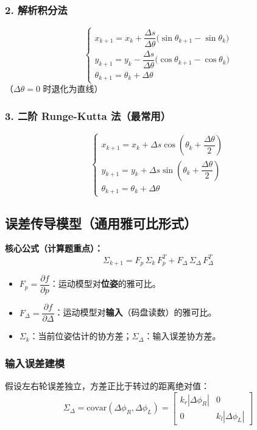 \documentclass[11pt,a4paper]{article}
\begin{document}
\subsubsection*{2. 解析积分法}
\[
\begin{cases}
x_{k+1}=x_k+\dfrac{\Delta s}{\Delta\theta}\bigl(\sin\theta_{k+1}-\sin\theta_k\bigr)\\[0.4em]
y_{k+1}=y_k-\dfrac{\Delta s}{\Delta\theta}\bigl(\cos\theta_{k+1}-\cos\theta_k\bigr)\\[0.4em]
\theta_{k+1}=\theta_k+\Delta\theta
\end{cases}
\]
（$\Delta\theta=0$ 时退化为直线）

\subsubsection*{3. 二阶 Runge-Kutta 法（最常用）}
\[
\boxed{\;
\begin{cases}
x_{k+1}=x_k+\Delta s\cos\!\left(\theta_k+\dfrac{\Delta\theta}{2}\right)\\[0.4em]
y_{k+1}=y_k+\Delta s\sin\!\left(\theta_k+\dfrac{\Delta\theta}{2}\right)\\[0.4em]
\theta_{k+1}=\theta_k+\Delta\theta
\end{cases}\;}
\]

\subsection{误差传导模型（通用雅可比形式）}

\begin{keypoint}
\textbf{核心公式（计算题重点）：}
\[
\boxed{\;\Sigma_{k+1}=F_p\,\Sigma_k\,F_p^{T}+F_\Delta\,\Sigma_\Delta\,F_\Delta^{T}\;}
\]
\begin{itemize}
  \item $F_p=\dfrac{\partial f}{\partial p}$：运动模型对\textbf{位姿}的雅可比。
  \item $F_\Delta=\dfrac{\partial f}{\partial \Delta}$：运动模型对\textbf{输入}（码盘读数）的雅可比。
  \item $\Sigma_k$：当前位姿估计的协方差；$\Sigma_\Delta$：输入误差协方差。
\end{itemize}
\end{keypoint}

\subsubsection*{输入误差建模}
假设左右轮误差独立，方差正比于转过的距离绝对值：
\[
\Sigma_\Delta=\mathrm{covar}(\Delta\phi_R,\Delta\phi_L)=
\begin{bmatrix}k_r|\Delta\phi_R| & 0\\ 0 & k_l|\Delta\phi_L|\end{bmatrix}
\]
\end{document}
